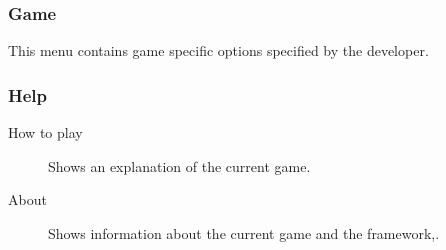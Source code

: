 \subsubsection{Game}
This menu contains game specific options specified by the developer.
\subsubsection{Help}
\begin{description}
	\item[How to play] Shows an explanation of the current game.
	\item[About] Shows information about the current game and the framework,.
\end{description}




